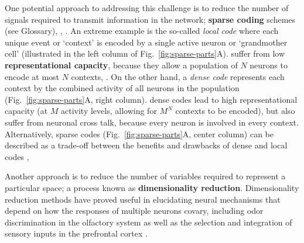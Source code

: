 One potential approach to addressing this challenge is to
reduce the number of signals required to transmit information in the network;
 \textbf{sparse coding} schemes (see Glossary),
, 
\cite{Foldiak1990,Field1994,LevyBaxter1996}.
An extreme example is the so-called \emph{local code}
where each unique event or `context' is encoded by a single active neuron
or `grandmother cell' \cite{RollsTreves1990}
(illustrated in the left column of Fig.~\ref{fig:sparse-parts}A).
 suffer from low \textbf{representational capacity},
because they allow a population of $N$ neurons to encode at most $N$ contexts,
.
On the other hand, a \emph{dense code}
represents each context by the combined activity
of all neurons in the population
(Fig.~\ref{fig:sparse-parts}A, right column).
dense codes lead to high representational capacity
(at $M$ activity levels, allowing for $M^N$ contexts to be encoded),
but also suffer from neuronal cross talk,
because every neuron is involved in every context.
Alternatively, sparse codes
(Fig.~\ref{fig:sparse-parts}A, center column)
can be described as a trade-off between the benefits and
drawbacks of dense and local codes 
\cite{SpanneJorntell2015,Foldiak1990},






Another approach is to reduce the number of
variables required to represent a particular  space;
a process known as
\textbf{dimensionality reduction}.
Dimensionality reduction methods have proved useful in elucidating neural mechanisms
that depend on how the responses of multiple neurons covary,
including odor discrimination in the olfactory system \cite{Broome2006,Koulakov2011}
as well as the selection and integration of sensory inputs 
in the prefrontal cortex \cite{Mante2013,CunninghamYu2014}.

